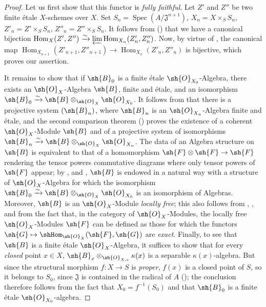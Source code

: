 \begin{proof}
Let us first show that this functor is \emph{fully faithful}.
Let $Z'$ and $Z''$ be two finite \'etale $X$-schemes over $X$.
Set $S_n=\operatorname{Spec}(A/\mathfrak{J}^{n+1})$, $X_n=X\times_S S_n$, $Z'_n=Z'\times_S S_n$, $Z''_n=Z''\times_S S_n$.
It follows from () that we have a canonical bijection $\operatorname{Hom}_X(Z',Z'')\xrightarrow{\sim}\varprojlim\operatorname{Hom}_{X_n}(Z'_n,Z''_n)$.
Now, by virtue of , the canonical map $\operatorname{Hom}_{X_{n+1}}(Z'_{n+1},Z''_{n+1})\to\operatorname{Hom}_{X_n}(Z'_n,Z''_n)$ is bijective, which proves our assertion.

It remains to show that if $\sh{B}_0$ is a finite \'etale $\sh{O}_{X_0}$-Algebra, there exists an $\sh{O}_X$-Algebra $\sh{B}$, finite and \'etale, and an isomorphism $\sh{B}_0\xrightarrow{\sim}\sh{B}\otimes_{\sh{O}_X}\sh{O}_{X_0}$.
It follows from  that there is a projective system $(\sh{B}_n)$, where $\sh{B}_n$ is an $\sh{O}_{X_n}$-Algebra finite and \'etale, and the second comparison theorem () proves the existence of a coherent $\sh{O}_X$-Module $\sh{B}$ and of a projective system of isomorphisms $\sh{B}_n\xrightarrow{\sim}\sh{B}\otimes_{\sh{O}_X}\sh{O}_{X_n}$.
The data of an Algebra structure on $\sh{B}$ is equivalent to that of a homomorphism $\sh{F}\otimes\sh{F}\to\sh{F}$ rendering the tensor powers commutative diagrams where only tensor powers of $\sh{F}$ appear;
by ,  and , $\sh{B}$ is endowed in a natural way with a structure of $\sh{O}_X$-Algebra for which the isomorphism $\sh{B}_0\xrightarrow{\sim}\sh{B}\otimes_{\sh{O}_X}\sh{O}_{X_0}$ is an isomorphism of Algebras.
Moreover, $\sh{B}$ is an $\sh{O}_X$-Module \emph{locally free};
this also follows from , ,  and from the fact that, in the category of $\sh{O}_X$-Modules, the locally free $\sh{O}_X$-Modules $\sh{F}$ can be defined as those for which the functors $\sh{G}\mapsto\shHom_{\sh{O}_X}(\sh{F},\sh{G})$ are \emph{exact}.
Finally, to see that $\sh{B}$ is a finite \'etale $\sh{O}_X$-Algebra, it suffices  to show that for every \emph{closed} point $x\in X$, $\sh{B}_x\otimes_{\sh{O}_{X,x}}\kappa(x)$ is a separable $\kappa(x)$-algebra.
But since the structural morphism $f:X\to S$ is \emph{proper}, $f(x)$ is a closed point of $S$, so it belongs to $S_0$, since $\mathfrak{J}$ is contained in the radical of $A$ ();
the conclusion therefore follows from the fact that $X_0=f^{-1}(S_0)$ and that $\sh{B}_0$ is a finite \'etale $\sh{O}_{X_0}$-algebra.
\end{proof}


